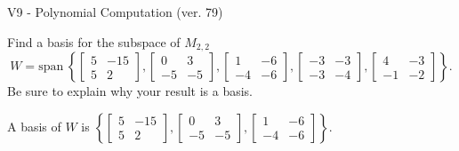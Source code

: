 \begin{exercise}
  \begin{exerciseTitle}V9 - Polynomial Computation (ver. 79)\end{exerciseTitle}
  \begin{exerciseStatement}
    Find a basis for the subspace of \(M_{2,2}\) 
\[W=\mathrm{span}\ \left\{\left[\begin{array}{cc}
5 & -15 \\
5 & 2
\end{array}\right] , \left[\begin{array}{cc}
0 & 3 \\
-5 & -5
\end{array}\right] , \left[\begin{array}{cc}
1 & -6 \\
-4 & -6
\end{array}\right] , \left[\begin{array}{cc}
-3 & -3 \\
-3 & -4
\end{array}\right] , \left[\begin{array}{cc}
4 & -3 \\
-1 & -2
\end{array}\right]\right\}.\]
 Be sure to explain why your result is a basis.


  \end{exerciseStatement}
  \begin{exerciseAnswer}
   A basis of \(W\) is  \(\left\{\left[\begin{array}{cc}
5 & -15 \\
5 & 2
\end{array}\right] , \left[\begin{array}{cc}
0 & 3 \\
-5 & -5
\end{array}\right] , \left[\begin{array}{cc}
1 & -6 \\
-4 & -6
\end{array}\right]\right\}\).
  


  \end{exerciseAnswer}
\end{exercise}